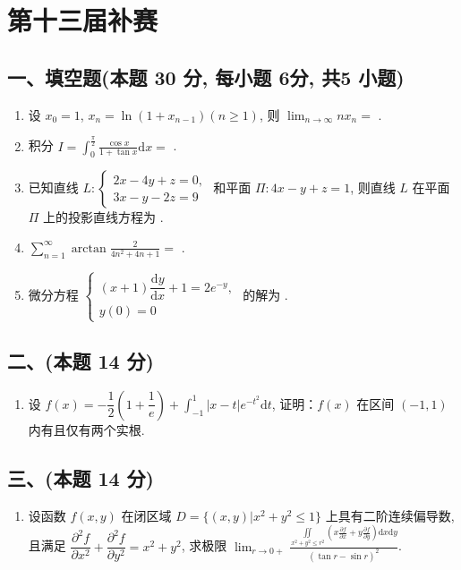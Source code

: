 \newpage
\section{第十三届补赛}

\subsection*{一、填空题(本题 30 分,  每小题 6分,  共5 小题)}
\begin{enumerate}
    \item 设 $x_0 = 1$, $x_n = \ln (1 + x_{n-1})(n \geq 1)$, 则 $\displaystyle\lim_{n \to \infty} nx_n = $ \underline{\quad\quad}.
    \item 积分 $I = \displaystyle\int_0^{\frac{\pi}{2}} \frac{\cos x}{1 + \tan x} \mathrm{d}x = $ \underline{\quad\quad}.
    \item 已知直线 $L : \begin{cases}
                  2x - 4y + z = 0, \\
                  3x - y - 2z = 9
              \end{cases}$ 和平面 $\Pi : 4x - y + z = 1$, 则直线 $L$ 在平面 $\Pi$ 上的投影直线方程为 \underline{\quad\quad}.
    \item $ \displaystyle\sum_{n=1}^{\infty} \arctan \frac{2}{4n^2 + 4n + 1} = $ \underline{\quad\quad}.
    \item 微分方程 $ \begin{cases}
                  (x + 1) \dfrac{\mathrm{d}y}{\mathrm{d}x} + 1 = 2e^{-y}, \\
                  y(0) = 0
              \end{cases} $ 的解为 \underline{\quad\quad}.
\end{enumerate}

\subsection*{二、(本题 14 分)}
\begin{enumerate}[start=6]
    \item 设 $f(x) = -\dfrac{1}{2} \left( 1 + \dfrac{1}{e} \right) + \displaystyle\int_{-1}^{1} |x - t| e^{-t^2} \mathrm{d}t$, 证明：$f(x)$ 在区间 $(-1,  1)$ 内有且仅有两个实根.
\end{enumerate}

\subsection*{三、(本题 14 分)}
\begin{enumerate}[start=7]
    \item 设函数 $f(x,  y)$ 在闭区域 $D = \{(x,  y)| x^2 + y^2 \leq 1\}$ 上具有二阶连续偏导数, 且满足 $ \dfrac{\partial^2 f}{\partial x^2} + \dfrac{\partial^2 f}{\partial y^2} = x^2 + y^2 $, 求极限 $ \displaystyle\lim_{r \to 0+} \frac{\displaystyle\iint\limits_{x^2 + y^2 \leq r^2} \left( x \frac{\partial f}{\partial x} + y \frac{\partial f}{\partial y} \right) \mathrm{d}x\mathrm{d}y}{(\tan r - \sin r)^2} $.
\end{enumerate}

